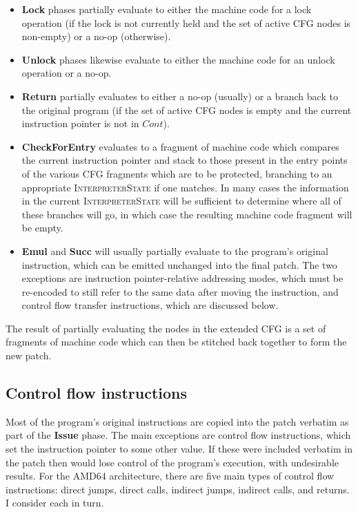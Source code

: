 \begin{itemize}
\item \textbf{Lock} phases partially evaluate to either the machine
  code for a lock operation (if the lock is not currently held and the
  set of active CFG nodes is non-empty) or a no-op (otherwise).

\item \textbf{Unlock} phases likewise evaluate to either the machine
  code for an unlock operation or a no-op.
\item \textbf{Return} partially evaluates to either a no-op (usually)
  or a branch back to the original program (if the set of active CFG
  nodes is empty and the current instruction pointer is not in
  $\mathit{Cont}$).

\item \textbf{CheckForEntry} evaluates to a fragment of machine code
  which compares the current instruction pointer and stack to those
  present in the entry points of the various CFG fragments which are
  to be protected, branching to an appropriate
  \textsc{InterpreterState} if one matches.  In many cases the
  information in the current \textsc{InterpreterState} will be
  sufficient to determine where all of these branches will go, in
  which case the resulting machine code fragment will be
  empty.

\item \textbf{Emul} and \textbf{Succ} will usually partially evaluate
  to the program's original instruction, which can be emitted
  unchanged into the final patch.  The two exceptions are instruction
  pointer-relative addressing modes, which must be re-encoded to still
  refer to the same data after moving the instruction, and control
  flow transfer instructions, which are discussed below.
\end{itemize}

The result of partially evaluating the nodes in the extended CFG is a
set of fragments of machine code which can then be stitched back
together to form the new patch.

\subsection{Control flow instructions}

Most of the program's original instructions are copied into the patch
verbatim as part of the \textbf{Issue} phase.  The main exceptions are
control flow instructions, which set the instruction pointer to some
other value.  If these were included verbatim in the patch then
{\implementation} would lose control of the program's execution, with
undesirable results.  For the AMD64 architecture, there are five main
types of control flow instructions: direct jumps, direct calls,
indirect jumps, indirect calls, and returns.  I consider each in turn.

